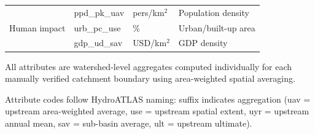 \begin{table}[htbp]
\begin{threeparttable}
\begin{tabular}{lllp{7cm}}
\midrule
\multirow{3}{*}{Human impact}
& ppd\_pk\_uav & pers/km$^2$ & Population density \\
& urb\_pc\_use & \% & Urban/built-up area \\
& gdp\_ud\_sav & USD/km$^2$ & GDP density \\
\bottomrule
\end{tabular}
\begin{tablenotes}
\small
\item All attributes are watershed-level aggregates computed individually for each manually verified catchment boundary using area-weighted spatial averaging.
\item Attribute codes follow HydroATLAS naming: suffix indicates aggregation (uav = upstream area-weighted average, use = upstream spatial extent, uyr = upstream annual mean, sav = sub-basin average, ult = upstream ultimate).
\end{tablenotes}
\end{threeparttable}
\end{table}
